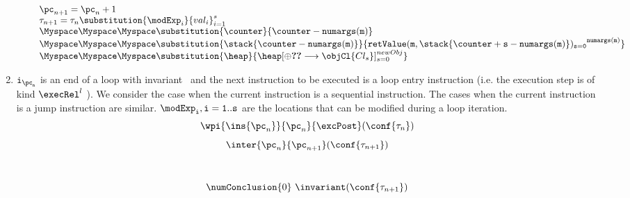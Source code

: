 \begin{enumerate}
\begin{enumerate}
		 \\
		
		$$ \begin{array}{l}
		\pc_{n+1} = \pc_n + 1	\\
		\state{n+1}=  \state{n} \substitution{\modExp_i  }{val_i}_{i =1}^{s}  \\
  		\Myspace \Myspace  \Myspace\substitution{\counter}{ \counter-\tt{numargs(m)}} \\
 		\Myspace \Myspace \Myspace \substitution{ \stack{\counter-\tt{numargs(m)} }}{\tt{retValue(m,\stack{\counter + s - numargs(m) })_{s=0} }^{numargs(m)}}\\
		\Myspace \Myspace \Myspace \substitution{\heap}{\heap[\oplus \Ref{Cl_s} \longrightarrow \objCl{Cl_s }]_{s=0}^{newObj} } \\

		\end{array} $$
	
\end{enumerate}
\item  $\tt{i_{\pc_n}} $ is an end of a loop with invariant \invariant \ and the next instruction to be executed is a loop entry 
instruction (i.e. the execution step is of kind $\execRel^l$ ). 
We consider the case when the current instruction is a sequential instruction. The cases when the current instruction 
is a jump instruction are similar. $\tt{\modExp_i, i = 1..s}$ are the locations that can be modified during a loop iteration.  \\ 
				
		  	
		  		 $$\wpi{\ins{{\pc_n}}}{\pc_n}{\excPost}(\conf{\state{n }} )  $$  
			$$	 \inter{\pc_n}{\pc_{n+1}}( \conf{\state{n +1 } })$$
				
				 \\
		 	
		 	
		 		$$  \numConclusion{0} \   \invariant (\conf{\state{n +1 }} )$$ 
		 	     	

\end{enumerate}
